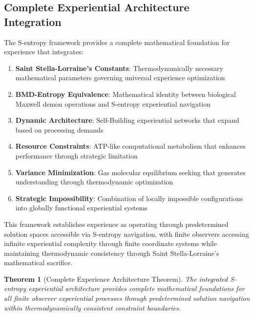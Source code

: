 \documentclass{article}
\newtheorem{theorem}{Theorem}[section]
\begin{document}
\subsection{Complete Experiential Architecture Integration}

The S-entropy framework provides a complete mathematical foundation for experience that integrates:

\begin{enumerate}
\item \textbf{Saint Stella-Lorraine's Constants}: Thermodynamically necessary mathematical parameters governing universal experience optimization
\item \textbf{BMD-Entropy Equivalence}: Mathematical identity between biological Maxwell demon operations and S-entropy experiential navigation
\item \textbf{Dynamic Architecture}: Self-Building experiential networks that expand based on processing demands
\item \textbf{Resource Constraints}: ATP-like computational metabolism that enhances performance through strategic limitation
\item \textbf{Variance Minimization}: Gas molecular equilibrium seeking that generates understanding through thermodynamic optimization
\item \textbf{Strategic Impossibility}: Combination of locally impossible configurations into globally functional experiential systems
\end{enumerate}

This framework establishes experience as operating through predetermined solution spaces accessible via S-entropy navigation, with finite observers accessing infinite experiential complexity through finite coordinate systems while maintaining thermodynamic consistency through Saint Stella-Lorraine's mathematical sacrifice.

\begin{theorem}[Complete Experience Architecture Theorem]
The integrated S-entropy experiential architecture provides complete mathematical foundations for all finite observer experiential processes through predetermined solution navigation within thermodynamically consistent constraint boundaries.
\end{theorem}
\end{document}
